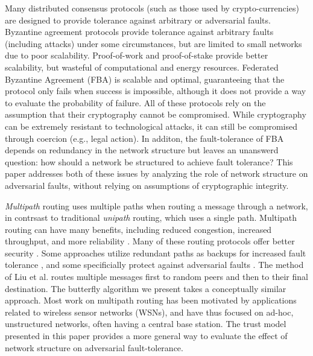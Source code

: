 \documentclass{sig-alternate-05-2015}
\begin{document}
Many distributed consensus protocols (such as those used by crypto-currencies)
are designed to provide tolerance against arbitrary or adversarial faults.
Byzantine agreement protocols
\cite{lamport_byzantine_1982,castro_practical_1999}
provide tolerance against arbitrary faults (including attacks) under
some circumstances, but are limited to small networks due to poor scalability.
Proof-of-work \cite{dwork_pricing_1993,nakamoto_bitcoin:_2008}
and proof-of-stake \cite{king_ppcoin:_2012}
provide better scalability, but wasteful of computational and energy
resources.
Federated Byzantine Agreement (FBA) \cite{mazieres_stellar_2015}
is scalable and optimal, guaranteeing that the protocol only fails when
success is impossible, although it does not provide a way to evaluate
the probability of failure.
All of these protocols rely on the assumption that their cryptography
cannot be compromised.
While cryptography can be extremely resistant to technological attacks,
it can still be compromised through coercion (e.g., legal action).
In additon, the fault-tolerance of FBA depends on redundancy in the network structure
but leaves an unanswerd question: how should a network be structured to achieve
fault tolerance?
This paper addresses both of these issues by analyzing the role of network
structure on adversarial faults, without relying on assumptions of cryptographic
integrity.

{\em Multipath} routing uses multiple paths when routing a message through a
network, in contrsast to traditional {\em unipath} routing, which uses
a single path.
Multipath routing can have many benefits, including reduced congestion,
increased throughput, and more reliability
\cite{qadir_exploiting_2015}.
Many of these routing protocols offer better security 
\cite{zin_survey_2015}.
Some approaches utilize redundant paths as backups for increased
fault tolerance
\cite{alrajeh_secure_2013},
and some specificially protect against adversarial faults
\cite{kohno_improvement_2012, khalil_unmask:_2010, lou_h-spread:_2006}.
The method of Liu et al.
\cite{liu_secure_2012}
routes multiple messages first to random peers and then
to their final destination.
The butterfly algorithm we present takes a conceptually similar approach.
Most work on multipath routing has been motivated by applications related to
wireless sensor networks (WSNs),
and have thus focused on ad-hoc, unstructured networks, often having a central
base station.
The trust model presented in this paper provides a more general way to evaluate
the effect of network structure on adversarial fault-tolerance.
\end{document}
